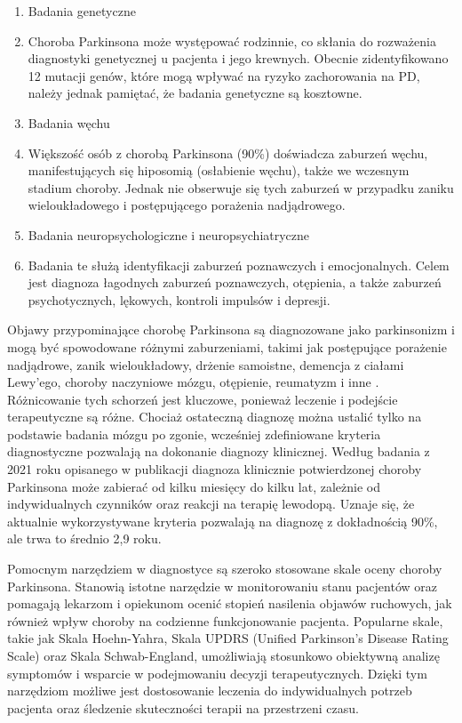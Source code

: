 \begin{enumerate}
	\item Badania genetyczne
	\item[] Choroba Parkinsona może występować rodzinnie, co skłania do rozważenia diagnostyki genetycznej u pacjenta i jego krewnych.
Obecnie zidentyfikowano 12 mutacji genów, które mogą wpływać na ryzyko zachorowania na PD, należy jednak pamiętać, że badania genetyczne są kosztowne.

	\item Badania węchu
	\item[] Większość osób z chorobą Parkinsona (90\%) doświadcza zaburzeń węchu, manifestujących się hiposomią (osłabienie węchu), także we wczesnym stadium choroby.
Jednak nie obserwuje się tych zaburzeń w przypadku zaniku wieloukładowego i postępującego porażenia nadjądrowego.

	\item Badania neuropsychologiczne i neuropsychiatryczne
	\item[] Badania te służą identyfikacji zaburzeń poznawczych i emocjonalnych.
Celem jest diagnoza łagodnych zaburzeń poznawczych, otępienia, a także zaburzeń psychotycznych, lękowych, kontroli impulsów i depresji.
\end{enumerate}

Objawy przypominające chorobę Parkinsona są diagnozowane jako parkinsonizm i mogą być spowodowane różnymi zaburzeniami, takimi jak postępujące porażenie nadjądrowe, zanik wieloukładowy,
drżenie samoistne, demencja z ciałami Lewy'ego, choroby naczyniowe mózgu, otępienie, reumatyzm i inne \cite{diagnostyka_Sitek}.
Różnicowanie tych schorzeń jest kluczowe, ponieważ leczenie i podejście terapeutyczne są różne.
Chociaż ostateczną diagnozę można ustalić tylko na podstawie badania mózgu po zgonie, wcześniej zdefiniowane kryteria diagnostyczne pozwalają na dokonanie diagnozy klinicznej.
Według badania z 2021 roku opisanego w publikacji \cite{ROSSI202153} diagnoza klinicznie potwierdzonej choroby Parkinsona może zabierać od kilku miesięcy do kilku lat, zależnie od indywidualnych czynników oraz reakcji na terapię lewodopą.
Uznaje się, że aktualnie wykorzystywane kryteria pozwalają na diagnozę z dokładnością 90\%, ale trwa to średnio 2,9 roku.

Pomocnym narzędziem w diagnostyce są szeroko stosowane skale oceny choroby Parkinsona.
Stanowią istotne narzędzie w monitorowaniu stanu pacjentów oraz pomagają lekarzom i opiekunom ocenić stopień nasilenia objawów ruchowych,
jak również wpływ choroby na codzienne funkcjonowanie pacjenta.
Popularne skale, takie jak Skala Hoehn-Yahra, Skala UPDRS (Unified Parkinson's Disease Rating Scale) oraz Skala Schwab-England,
umożliwiają stosunkowo obiektywną analizę symptomów i wsparcie w podejmowaniu decyzji terapeutycznych.
Dzięki tym narzędziom możliwe jest dostosowanie leczenia do indywidualnych potrzeb pacjenta oraz śledzenie skuteczności terapii na przestrzeni czasu.

